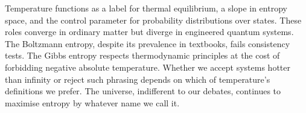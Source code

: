 Temperature functions as a label for thermal equilibrium, a slope in entropy space, and the control parameter for probability distributions over states. These roles converge in ordinary matter but diverge in engineered quantum systems. The Boltzmann entropy, despite its prevalence in textbooks, fails consistency tests. The Gibbs entropy respects thermodynamic principles at the cost of forbidding negative absolute temperature. Whether we accept systems \QSOpen{}hotter than infinity\QSClose{} or reject such phrasing depends on which of temperature's definitions we prefer. The universe, indifferent to our debates, continues to maximise entropy by whatever name we call it.
